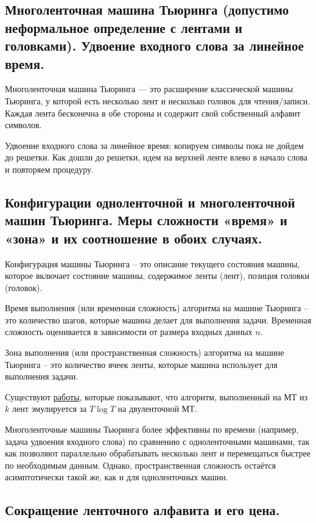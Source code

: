 \documentclass[a4paper, 10pt]{article}
\begin{document}
\subsection{Многоленточная машина Тьюринга (допустимо неформальное определение с лентами и головками). Удвоение входного слова за линейное время.}

Многоленточная машина Тьюринга — это расширение классической машины Тьюринга, у которой есть несколько лент и несколько головок для чтения/записи. Каждая лента бесконечна в обе стороны и содержит свой собственный алфавит символов.

Удвоение входного слова за линейное время: копируем символы пока не дойдем до решетки. Как дошли до решетки, идем на верхней ленте влево в начало слова и повторяем процедуру.

\subsection{Конфигурации одноленточной и многоленточной машин Тьюринга. Меры сложности «время» и «зона» и их соотношение в обоих случаях.}

Конфигурация машины Тьюринга -- это описание текущего состояния машины, которое включает состояние машины, содержимое ленты (лент), позиция головки (головок).

Время выполнения (или временная сложность) алгоритма на машине Тьюринга -- это количество шагов, которые машина делает для выполнения задачи. Временная сложность оценивается в зависимости от размера входных данных $n$.

Зона выполнения (или пространственная сложность) алгоритма на машине Тьюринга -- это количество ячеек ленты, которые машина использует для выполнения задачи.

\hfill

Существуют \href{https://www.cs.bu.edu/faculty/gacs/courses/cs535/papers/HennieStearns66.pdf}{работы}, которые показывают, что алгоритм, выполненный на МТ из $k$ лент эмулируется за $T\log T$ на двуленточной МТ.

Многоленточные машины Тьюринга более эффективны по времени (например, задача удвоения входного слова) по сравнению с одноленточными машинами, так как позволяют параллельно обрабатывать несколько лент и перемещаться быстрее по необходимым данным. Однако, пространственная сложность остаётся асимптотически такой же, как и для одноленточных машин.

\subsection{Сокращение ленточного алфавита и его цена.}
\end{document}
